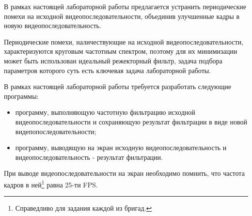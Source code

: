 
В рамках настоящей лабораторной работы предлагается устранить периодические помехи на исходной видеопоследовательности, объединив улучшенные кадры в новую видеопоследовательность.

Периодические помехи, наличествующие на исходной видеопоследовательности, характеризуются круговым частотным спектром, поэтому для их минимизации может быть использован идеальный режекторный фильтр, задача подбора параметров которого суть есть ключевая задача лабораторной работы.

В рамках настоящей лабораторной работы требуется разработать следующие программы:

\begin{itemize}

	\item программу, выполняющую частотную фильтрацию исходной видеопоследовательности и сохраняющую результат фильтрации в виде новой видепопоследовательности;
	\item программу, выводящую на экран исходную видеопоследовательность и видеопоследовательность - результат фильтрации.

\end{itemize}

При выводе видеопоследовательности на экран необходимо помнить, что частота кадров в ней\footnote{Справедливо для задания каждой из бригад.} равна 25-ти FPS.


